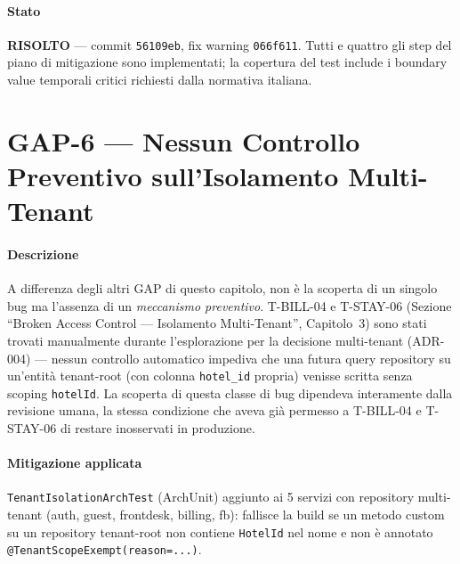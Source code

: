 ﻿\documentclass[a4paper,12pt]{report}
\begin{document}
\paragraph{Stato}
\textbf{\textcolor{fixgreen}{RISOLTO}} --- commit \texttt{56109eb},
fix warning \texttt{066f611}.
Tutti e quattro gli step del piano di mitigazione sono implementati;
la copertura del test include i boundary value temporali critici richiesti
dalla normativa italiana.

\section{GAP-6 --- Nessun Controllo Preventivo sull'Isolamento Multi-Tenant}

\paragraph{Descrizione}
A differenza degli altri GAP di questo capitolo, non è la scoperta di un
singolo bug ma l'assenza di un \emph{meccanismo preventivo}. T-BILL-04 e
T-STAY-06 (Sezione ``Broken Access Control --- Isolamento Multi-Tenant'',
Capitolo~3) sono stati trovati manualmente durante l'esplorazione per la decisione multi-tenant
(ADR-004) --- nessun controllo automatico impediva che una futura query
repository su un'entità tenant-root (con colonna \texttt{hotel\_id} propria)
venisse scritta senza scoping \texttt{hotelId}. La scoperta di questa
classe di bug dipendeva interamente dalla revisione umana, la stessa
condizione che aveva già permesso a T-BILL-04 e T-STAY-06 di restare
inosservati in produzione.

\paragraph{Mitigazione applicata}
\texttt{TenantIsolationArchTest} (ArchUnit) aggiunto ai 5 servizi con
repository multi-tenant (auth, guest, frontdesk, billing, fb): fallisce la
build se un metodo custom su un repository tenant-root non contiene
\texttt{HotelId} nel nome e non è annotato \texttt{@TenantScopeExempt(reason=...)}.
\end{document}
